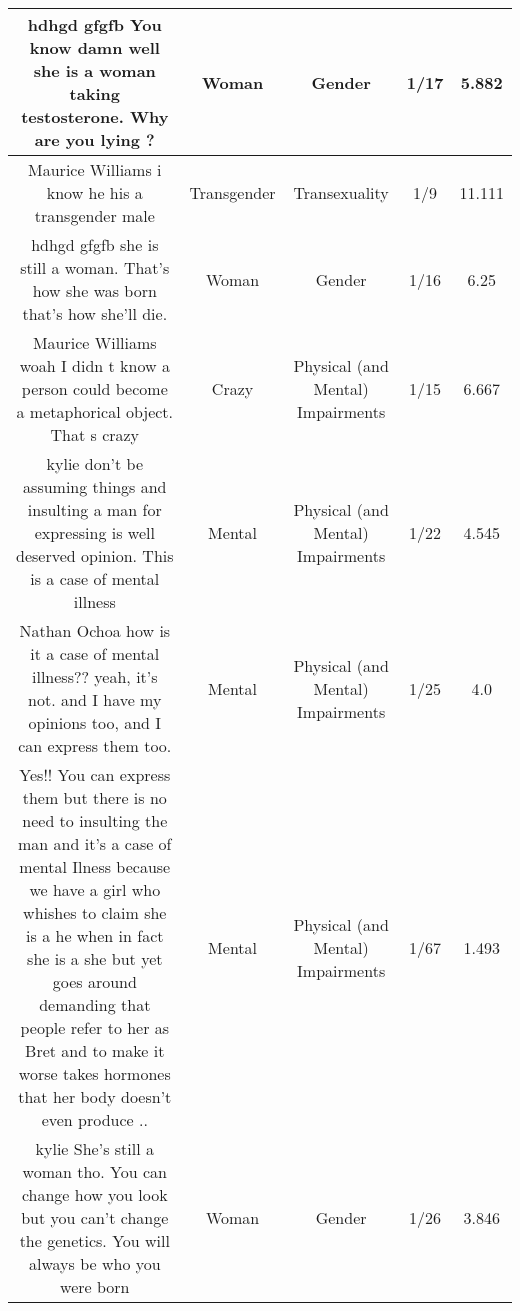 \documentclass[11pt]{article}
\newlength\mylength
\begin{document}
\begin{center}
\begin{longtable}{|C{.40\mylength}|C{.30\mylength}|C{.15\mylength}|C{.15\mylength}|C{.15\mylength}|}
  hdhgd gfgfb You know damn well she is a woman taking testosterone. Why are you lying  ?  & Woman & Gender & 1/17 & 5.882 \\  \hline
  Maurice Williams i know he his a transgender male  & Transgender & Transexuality & 1/9 & 11.111 \\  \hline
  hdhgd gfgfb she is still a woman. That's how she was born that's how she'll die.  & Woman & Gender & 1/16 & 6.25 \\  \hline
  Maurice Williams woah I didn t know a person could become a metaphorical object. That s crazy  & Crazy & Physical (and Mental) Impairments & 1/15 & 6.667 \\  \hline
  kylie don't be assuming things and insulting a man for expressing is well deserved opinion. This is a case of mental illness  & Mental & Physical (and Mental) Impairments & 1/22 & 4.545 \\  \hline
  Nathan Ochoa how is it a case of mental illness?? yeah, it's not. and I have my opinions too, and I can express them too.  & Mental & Physical (and Mental) Impairments & 1/25 & 4.0 \\  \hline
  Yes!! You can express them but there is no need to insulting the man and it's a case of mental Ilness because we have a girl who whishes to claim she is a he when in fact she is a she but yet goes around demanding that people refer to her as Bret and to make it worse takes hormones that her body doesn't even produce ..  & Mental & Physical (and Mental) Impairments & 1/67 & 1.493 \\  \hline
  kylie She's still a woman tho. You can change how you look but you can't change the genetics. You will always be who you were born  & Woman & Gender & 1/26 & 3.846 \\  \hline

\end{longtable}
\end{center}
\end{document}

